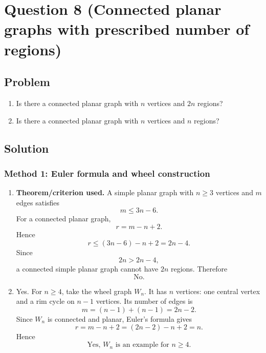 \documentclass[12pt]{article}
\begin{document}
\newpage
\section{Question 8 (Connected planar graphs with prescribed number of regions)}

\subsection{Problem}
\begin{enumerate}[label=(\alph*)]
  \item Is there a connected planar graph with $n$ vertices and $2n$ regions?
  \item Is there a connected planar graph with $n$ vertices and $n$ regions?
\end{enumerate}

\subsection{Solution}

\subsubsection{Method 1: Euler formula and wheel construction}
\begin{enumerate}[label=(\alph*)]
  \item \textbf{Theorem/criterion used.} A simple planar graph with $n\ge 3$ vertices and $m$ edges satisfies
  \[
    m\le 3n-6.
  \]
  For a connected planar graph,
  \[
    r=m-n+2.
  \]
  Hence
  \[
    r\le (3n-6)-n+2=2n-4.
  \]
  Since
  \[
    2n>2n-4,
  \]
  a connected simple planar graph cannot have $2n$ regions. Therefore
  \[
    \boxed{\text{No}.}
  \]

  \item Yes. For $n\ge 4$, take the wheel graph $W_n$. It has $n$ vertices: one central vertex and a rim cycle on $n-1$ vertices. Its number of edges is
  \[
    m=(n-1)+(n-1)=2n-2.
  \]
  Since $W_n$ is connected and planar, Euler's formula gives
  \[
    r=m-n+2=(2n-2)-n+2=n.
  \]
  Hence
  \[
    \boxed{\text{Yes, }W_n\text{ is an example for }n\ge 4.}
  \]
\end{enumerate}
\end{document}
